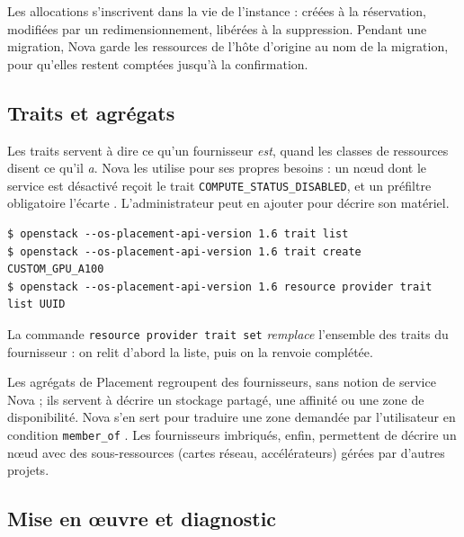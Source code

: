Les allocations s'inscrivent dans la vie de l'instance : créées à la réservation, modifiées par un
redimensionnement, libérées à la suppression. Pendant une migration, Nova garde les ressources de l'hôte d'origine
au nom de la migration, pour qu'elles restent comptées jusqu'à la confirmation.

\subsection{Traits et agrégats}\label{sec:pl-traits}

Les \glspl{trait} servent à dire ce qu'un fournisseur \emph{est}, quand les classes de ressources disent ce qu'il
\emph{a}. Nova les utilise pour ses propres besoins : un nœud dont le service est désactivé reçoit le trait
\texttt{COMPUTE\_STATUS\_DISABLED}, et un préfiltre obligatoire l'écarte \parencite{nova-scheduling}. L'administrateur
peut en ajouter pour décrire son matériel.

\par\noindent\begin{minipage}{\linewidth}
\begin{lstlisting}[style=terminal]
$ openstack --os-placement-api-version 1.6 trait list
$ openstack --os-placement-api-version 1.6 trait create CUSTOM_GPU_A100
$ openstack --os-placement-api-version 1.6 resource provider trait list UUID
\end{lstlisting}
\end{minipage}\par

La commande \texttt{resource provider trait set} \emph{remplace} l'ensemble des traits du fournisseur : on relit
d'abord la liste, puis on la renvoie complétée.

Les agrégats de Placement regroupent des fournisseurs, sans notion de service Nova ; ils servent à décrire un
stockage partagé, une affinité ou une zone de disponibilité. Nova s'en sert pour traduire une zone demandée par
l'utilisateur en condition \texttt{member\_of} \parencite{nova-scheduling,placement-api-ref}. Les fournisseurs
imbriqués, enfin, permettent de décrire un nœud avec des sous-ressources (cartes réseau, accélérateurs) gérées par
d'autres projets.

\subsection{Mise en œuvre et diagnostic}\label{sec:pl-deploiement}

